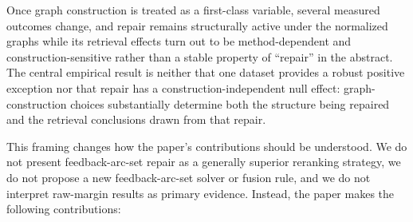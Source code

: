 \documentclass[manuscript,anonymous,review]{acmart}
\begin{document}
Once graph construction is treated as a first-class variable, several measured
outcomes change, and repair remains structurally active under the normalized
graphs while its retrieval effects turn out to be method-dependent and
construction-sensitive rather than a stable property of ``repair'' in the
abstract. The central empirical result is neither that one dataset provides a
robust positive exception nor that repair has a construction-independent null
effect: graph-construction choices substantially determine both the structure
being repaired and the retrieval conclusions drawn from that repair.

This framing changes how the paper's contributions should be understood. We
do not present feedback-arc-set repair as a generally superior reranking
strategy, we do not propose a new feedback-arc-set solver or fusion rule, and
we do not interpret raw-margin results as primary evidence. Instead, the
paper makes the following contributions:
\end{document}
